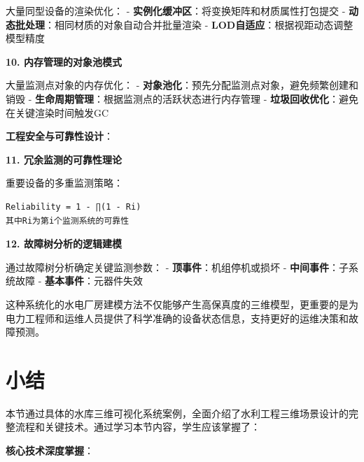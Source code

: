 大量同型设备的渲染优化： - \textbf{实例化缓冲区}：将变换矩阵和材质属性打包提交 - \textbf{动态批处理}：相同材质的对象自动合并批量渲染 - \textbf{LOD自适应}：根据视距动态调整模型精度

\textbf{10. 内存管理的对象池模式}

大量监测点对象的内存优化： - \textbf{对象池化}：预先分配监测点对象，避免频繁创建和销毁 - \textbf{生命周期管理}：根据监测点的活跃状态进行内存管理 - \textbf{垃圾回收优化}：避免在关键渲染时间触发GC

\textbf{工程安全与可靠性设计}：

\textbf{11. 冗余监测的可靠性理论}

重要设备的多重监测策略：

\begin{lstlisting}
Reliability = 1 - ∏(1 - Ri)
其中Ri为第i个监测系统的可靠性
\end{lstlisting}

\textbf{12. 故障树分析的逻辑建模}

通过故障树分析确定关键监测参数： - \textbf{顶事件}：机组停机或损坏 - \textbf{中间事件}：子系统故障 - \textbf{基本事件}：元器件失效

这种系统化的水电厂房建模方法不仅能够产生高保真度的三维模型，更重要的是为电力工程师和运维人员提供了科学准确的设备状态信息，支持更好的运维决策和故障预测。

\section{小结}

本节通过具体的水库三维可视化系统案例，全面介绍了水利工程三维场景设计的完整流程和关键技术。通过学习本节内容，学生应该掌握了：

\textbf{核心技术深度掌握}：


